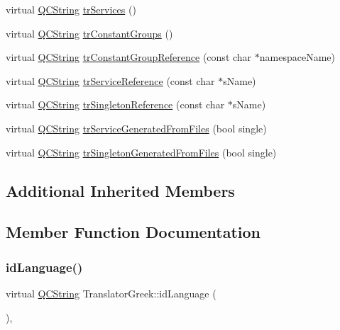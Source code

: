 \begin{DoxyCompactItemize}
\item 
virtual \mbox{\hyperlink{class_q_c_string}{Q\+C\+String}} \mbox{\hyperlink{class_translator_greek_a0b33a7139d6831f9592a05dbe8263558}{tr\+Services}} ()
\item 
virtual \mbox{\hyperlink{class_q_c_string}{Q\+C\+String}} \mbox{\hyperlink{class_translator_greek_a3e20decab3dc1713ff5eefd2363aa671}{tr\+Constant\+Groups}} ()
\item 
virtual \mbox{\hyperlink{class_q_c_string}{Q\+C\+String}} \mbox{\hyperlink{class_translator_greek_a36e0dcd5eba7efc3937dc31919b3333f}{tr\+Constant\+Group\+Reference}} (const char $\ast$namespace\+Name)
\item 
virtual \mbox{\hyperlink{class_q_c_string}{Q\+C\+String}} \mbox{\hyperlink{class_translator_greek_ad6a00870dc86a1074d9fc0840affd061}{tr\+Service\+Reference}} (const char $\ast$s\+Name)
\item 
virtual \mbox{\hyperlink{class_q_c_string}{Q\+C\+String}} \mbox{\hyperlink{class_translator_greek_ae2752ef64b7b0954b98781d92b932731}{tr\+Singleton\+Reference}} (const char $\ast$s\+Name)
\item 
virtual \mbox{\hyperlink{class_q_c_string}{Q\+C\+String}} \mbox{\hyperlink{class_translator_greek_a3a57af3347ef4189a44f2dac550ec968}{tr\+Service\+Generated\+From\+Files}} (bool single)
\item 
virtual \mbox{\hyperlink{class_q_c_string}{Q\+C\+String}} \mbox{\hyperlink{class_translator_greek_a713979e553e9d66e16358246c6be4206}{tr\+Singleton\+Generated\+From\+Files}} (bool single)
\end{DoxyCompactItemize}
\subsection*{Additional Inherited Members}


\subsection{Member Function Documentation}
\mbox{\label{class_translator_greek_ad6e96c153aadb9ed725c5180bb9a1141}} 
\subsubsection{\texorpdfstring{idLanguage()}{idLanguage()}}
{\footnotesize\ttfamily virtual \mbox{\hyperlink{class_q_c_string}{Q\+C\+String}} Translator\+Greek\+::id\+Language (\begin{DoxyParamCaption}{ }\end{DoxyParamCaption})\hspace{0.3cm}{\ttfamily [inline]}, {\ttfamily [virtual]}}


